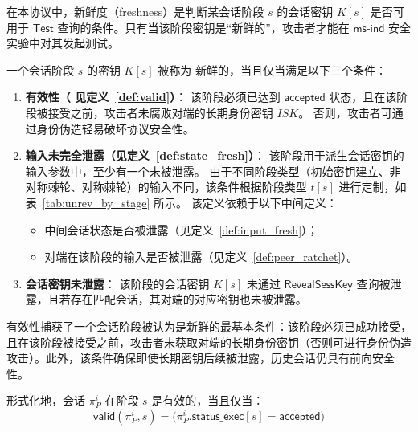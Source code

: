 \begin{definition}[新鲜度]
\label{def:freshness}
在本协议中，新鲜度（freshness）是判断某会话阶段 $s$ 的会话密钥 $K[s]$ 是否可用于 $\mathsf{Test}$ 查询的条件。只有当该阶段密钥是“新鲜的”，攻击者才能在 $\mathsf{ms\text{-}ind}$ 安全实验中对其发起测试。

一个会话阶段 $s$ 的密钥 $K[s]$ 被称为 新鲜的，当且仅当满足以下三个条件：
\begin{enumerate}[label=(\arabic*), wide, labelwidth=!, labelindent=0pt]
  \item \textbf{有效性（ 见定义~\ref{def:valid}）}：  
        该阶段必须已达到 $\mathsf{accepted}$ 状态，且在该阶段被接受之前，攻击者未腐败对端的长期身份密钥 $ISK$。  
        否则，攻击者可通过身份伪造轻易破坏协议安全性。

  \item \textbf{输入未完全泄露（见定义~\ref{def:state_fresh}）}：  
        该阶段用于派生会话密钥的输入参数中，至少有一个未被泄露。  
        由于不同阶段类型（初始密钥建立、非对称棘轮、对称棘轮）的输入不同，该条件根据阶段类型 $t[s]$ 进行定制，如表~\ref{tab:unrev_by_stage} 所示。  
        该定义依赖于以下中间定义：
        \begin{itemize}
          \item 中间会话状态是否被泄露（见定义~\ref{def:input_fresh}）；
          \item 对端在该阶段的输入是否被泄露（见定义~\ref{def:peer_ratchet}）。
        \end{itemize}

  \item \textbf{会话密钥未泄露}：  
        该阶段的会话密钥 $K[s]$ 未通过 $\mathsf{RevealSessKey}$ 查询被泄露，且若存在匹配会话，其对端的对应密钥也未被泄露。
\end{enumerate}
\end{definition}
    
\begin{definition}[有效性]
\label{def:valid}
有效性捕获了一个会话阶段被认为是新鲜的最基本条件：该阶段必须已成功接受，且在该阶段被接受之前，攻击者未获取对端的长期身份密钥（否则可进行身份伪造攻击）。此外，该条件确保即使长期密钥后续被泄露，历史会话仍具有前向安全性。

形式化地，会话 $\pi_P^i$ 在阶段 $s$ 是有效的，当且仅当：
\[
\mathsf{valid}(\pi_P^i, s) = \big( \pi_P^i.\mathsf{status\_exec}[s] = \mathsf{accepted} \big)
\]
\end{definition}

